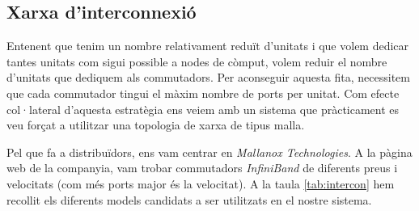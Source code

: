 \subsection{Xarxa d'interconnexió}

Entenent que tenim un nombre relativament reduït d'unitats i que volem dedicar tantes unitats com 
sigui possible a nodes de còmput, volem reduir el nombre d'unitats que dediquem als commutadors. Per aconseguir aquesta fita, necessitem que cada commutador tingui el màxim
nombre de ports per unitat.
Com efecte col·lateral d'aquesta estratègia ens veiem amb un sistema que pràcticament es veu forçat a utilitzar una topologia de xarxa de tipus malla.

Pel que fa a distribuïdors, ens vam centrar en \textit{Mallanox Technologies}. A la pàgina web
\cite{mellanox-web} de la companyia, vam trobar commutadors \textit{InfiniBand} de diferents preus
i velocitats (com més ports major és la velocitat). A la taula \ref{tab:intercon} hem recollit els 
diferents models candidats a ser utilitzats en el nostre sistema.

\begin{table}[H]
\begin{adjustwidth}{-.5in}{-.5in}  
    \begin{center}
        \centering
    \caption{Comparació entre les diferents configuracions dels nodes.}
    \label{tab:intercon}
    \end{center}
\end{adjustwidth}
\end{table}

